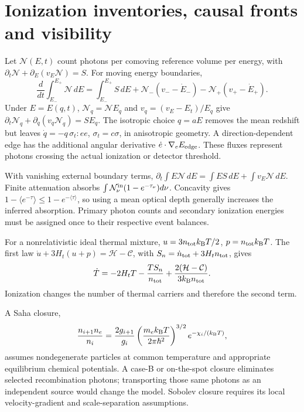 \section{Ionization inventories, causal fronts and visibility}
\label{v:ionization_inventory}

Let $\mathcal N(E,t)$ count photons per comoving reference volume per energy, with
$\partial_t\mathcal N+\partial_E(v_E\mathcal N)=S$. For moving energy boundaries,
\begin{equation}
 \frac{d}{dt}\int_{E_-}^{E_+}\mathcal N\,dE
 =\int_{E_-}^{E_+}S\,dE+
 \mathcal N_-(v_--\dot E_-)-\mathcal N_+(v_+-\dot E_+).
 \label{v:moving_band}
\end{equation}
Under $E=E(q,t)$, $\mathcal N_q=\mathcal N E_q$ and
$v_q=(v_E-E_t)/E_q$ give
$\partial_t\mathcal N_q+\partial_q(v_q\mathcal N_q)=SE_q$.
The isotropic choice $q=aE$ removes the mean redshift but leaves
$\dot q=-q\,\sigma_t:ee$, $\sigma_t=c\sigma$, in anisotropic geometry. A direction-dependent edge has the additional angular derivative $\dot e\cdot\nabla_eE_{\rm edge}$. These fluxes represent photons crossing the actual ionization or detector threshold.

With vanishing external boundary terms,
$\partial_t\int E\mathcal N\,dE=\int ES\,dE+\int v_E\mathcal N\,dE$.
Finite attenuation absorbs $\int\mathcal N_\nu^{\rm in}(1-e^{-\tau_\nu})d\nu$.
Concavity gives $1-\langle e^{-\tau}\rangle\le1-e^{-\langle\tau\rangle}$, so using a mean optical depth generally increases the inferred absorption. Primary photon counts and secondary ionization energies must be assigned once to their respective event balances.

For a nonrelativistic ideal thermal mixture,
$u=3n_{\rm tot}k_{\rm B}T/2$, $p=n_{\rm tot}k_{\rm B}T$.
The first law $\dot u+3H_t(u+p)=\mathcal H-\mathcal C$, with
$S_n=\dot n_{\rm tot}+3H_tn_{\rm tot}$, gives
\begin{equation}
 \dot T=-2H_tT-\frac{TS_n}{n_{\rm tot}}+
 \frac{2(\mathcal H-\mathcal C)}{3k_{\rm B}n_{\rm tot}} .
 \label{v:carrier_temperature}
\end{equation}
Ionization changes the number of thermal carriers and therefore the second term.

A Saha closure,
\begin{equation}
 \frac{n_{i+1}n_e}{n_i}=
 \frac{2g_{i+1}}{g_i}
 \left(\frac{m_ek_{\rm B}T}{2\pi\hbar^2}\right)^{3/2}
 e^{-\chi_i/(k_{\rm B}T)},
 \label{v:saha}
\end{equation}
assumes nondegenerate particles at common temperature and appropriate equilibrium chemical potentials. A case-B or on-the-spot closure eliminates selected recombination photons; transporting those same photons as an independent source would change the model. Sobolev closure requires its local velocity-gradient and scale-separation assumptions.

